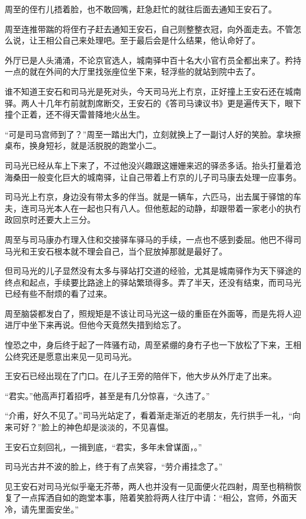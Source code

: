 周至的侄冇儿捂着脸，也不敢回嘴，赶急赶忙的就往后面去通知王安石了。

周至连推带踹的将侄冇子赶去通知王安石，自己则整整衣冠，向外面走去。不管怎么说，让王相公自己来处理吧。至于最后会是什么结果，他认命好了。

外厅已是人头涌涌，不论京官选人，城南驿中百十名大小官冇员全都出来了。矜持一点的就在外间的大厅里找张座位坐下来，轻浮些的就站到院中去了。

谁不知道王安石和司马光是死对头，今天司马光上冇京，正好撞上王安石还在城南驿。两人十几年冇前就割席断交，王安石的《答司马谏议书》更是遍传天下，眼下撞个正着，还不得天雷普降地火丛生。

“可是司马宫师到了？”周至一踏出大门，立刻就换上了一副讨人好的笑脸。拿块擦桌布，换身短衫，就是活脱脱的跑堂小二。

司马光已经从车上下来了，不过他没兴趣跟这姗姗来迟的驿丞多话。抬头打量着沧海桑田一般变化巨大的城南驿，让自己带着上冇京的儿子司马康去处理一应事务。

司马光上冇京，身边没有带太多的伴当。就是一辆车，六匹马，出去属于驿馆的车夫，连司马光本人在一起也只有八人。但他惹起的动静，却跟带着一家老小的执冇政回京时还要大上三分。

周至与司马康办冇理入住和交接驿车驿马的手续，一点也不感到委屈。他巴不得司马光和王安石根本就不理会自己，当个屁放掉那就是最好了。

但司马光的儿子显然没有太多与驿站打交道的经验，尤其是城南驿作为天下驿途的终点和起点，手续要比路途上的驿站繁琐得多。弄了半天，还没有结束，而司马光已经有些不耐烦的看了过来。

周至脑袋都发白了，照规矩是不该让司马光这一级的重臣在外面等，而是先将人迎进厅中坐下来再说。但他今天竟然失措到给忘了。

惶恐之中，身后终于起了一阵骚冇动，周至紧绷的身冇子也一下放松了下来，王相公终究还是愿意出来见一见司马光。

王安石已经出现在了门口。在儿子王旁的陪伴下，他大步从外厅走了出来。

“君实。”他高声打着招呼，甚至是有几分惊喜，“久违了。”

“介甫，好久不见了。”司马光站定了，看着渐走渐近的老朋友，先行拱手一礼，“向来可好？”脸上的神色却是淡淡的，不见喜愠。

王安石立刻回礼，一揖到底，“君实，多年未曾谋面，。”

司马光古井不波的脸上，终于有了点笑容，“劳介甫挂念了。”

见王安石对司马光似乎毫无芥蒂，两人也并没有一见面便火花四射，周至也稍稍恢复了一点挥洒自如的跑堂本事，陪着笑脸将两人往厅中请：“相公，宫师，外面天冷，请先里面安坐。”

